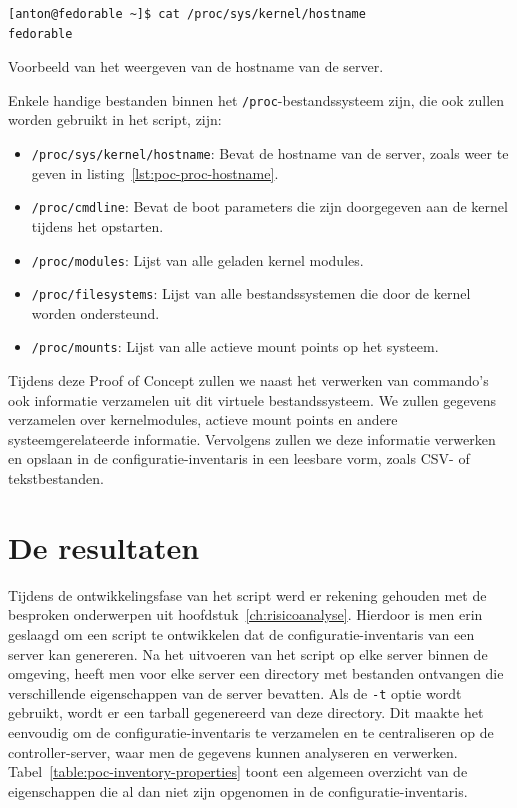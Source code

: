 \begin{listing}
  \begin{verbatim}
[anton@fedorable ~]$ cat /proc/sys/kernel/hostname
fedorable
  \end{verbatim}
  \caption[Weergave van server hostname.]{Voorbeeld van het weergeven van de hostname van de server.}
  \label{lst:poc-proc-hostname}
\end{listing}

Enkele handige bestanden binnen het \texttt{/proc}-bestandssysteem zijn, die ook zullen worden gebruikt in het script, zijn:

\begin{itemize}
    \item \texttt{/proc/sys/kernel/hostname}: Bevat de hostname van de server, zoals weer te geven in listing~\ref{lst:poc-proc-hostname}.
    \item \texttt{/proc/cmdline}: Bevat de boot parameters die zijn doorgegeven aan de kernel tijdens het opstarten.
    \item \texttt{/proc/modules}: Lijst van alle geladen kernel modules.
    \item \texttt{/proc/filesystems}: Lijst van alle bestandssystemen die door de kernel worden ondersteund.
    \item \texttt{/proc/mounts}: Lijst van alle actieve mount points op het systeem.
\end{itemize}

Tijdens deze Proof of Concept zullen we naast het verwerken van commando's ook informatie verzamelen uit dit virtuele bestandssysteem.
We zullen gegevens verzamelen over kernelmodules, actieve mount points en andere systeemgerelateerde informatie.
Vervolgens zullen we deze informatie verwerken en opslaan in de configuratie-inventaris in een leesbare vorm, zoals CSV- of tekstbestanden.

\section{De resultaten}
\label{poc_resultaten}

Tijdens de ontwikkelingsfase van het script werd er rekening gehouden met de besproken onderwerpen uit hoofdstuk~\ref{ch:risicoanalyse}.
Hierdoor is men erin geslaagd om een script te ontwikkelen dat de configuratie-inventaris van een server kan genereren.
Na het uitvoeren van het script op elke server binnen de omgeving, heeft men voor elke server een directory met bestanden ontvangen die verschillende eigenschappen van de server bevatten.
Als de \texttt{-t} optie wordt gebruikt, wordt er een tarball gegenereerd van deze directory.
Dit maakte het eenvoudig om de configuratie-inventaris te verzamelen en te centraliseren op de controller-server, waar men de gegevens kunnen analyseren en verwerken.
Tabel~\ref{table:poc-inventory-properties} toont een algemeen overzicht van de eigenschappen die al dan niet zijn opgenomen in de configuratie-inventaris.

